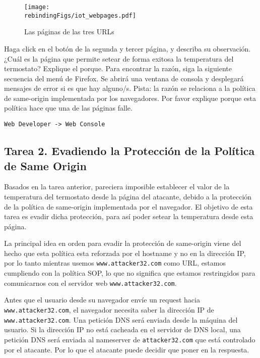 \begin{figure}[htb]
\begin{center}
\texttt{[image: \\rebindingFigs/iot\_webpages.pdf]}
\end{center}
\caption{Las páginas de las tres URLs}
\label{rebinding:fig:webpages}
\end{figure}
 
Haga click en el botón de la segunda y tercer página, y describa su observación. ¿Cuál es la página que permite setear de forma exitosa la temperatura del termostato? Explique el porque.
Para encontrar la razón, siga la siguiente secuencia del menú de Firefox. Se abrirá una ventana de consola y desplegará mensajes de error si es que hay alguno/s. Pista: la razón se relaciona a la política de same-origin implementada por los navegadores. Por favor explique porque esta política hace que una de las páginas falle.

 
\begin{lstlisting}
Web Developer -> Web Console
\end{lstlisting}
  


\subsection{Tarea 2. Evadiendo la Protección de la Política de Same Origin}

Basados en la tarea anterior, pareciera imposible establecer el valor de la temperatura del termostato desde la página del atacante, debido a la protección de la política de same-origin implementada por el navegador. El objetivo de esta tarea es evadir dicha protección, para así poder setear la temperatura desde esta página.

La principal idea en orden para evadir la protección de same-origin viene del hecho que esta política esta reforzada por el hostname y no en la dirección IP, por lo tanto mientras  usemos \texttt{www.attacker32.com} como URL, estamos cumpliendo con la política SOP, lo que no significa que estamos restringidos para comunicarnos con el servidor web \texttt{www.attacker32.com}.

Antes que el usuario desde su navegador envíe un request hacia \texttt{www.attacker32.com}, el navegador necesita saber la dirección IP de \texttt{www.attacker32.com}. Una petición DNS será enviada desde la máquina del usuario. Si la dirección IP no está cacheada en el servidor de DNS local, una petición DNS será enviada al nameserver de \texttt{attacker32.com} que está controlado por el atacante.
Por lo que el atacante puede decidir que poner en la respuesta.


